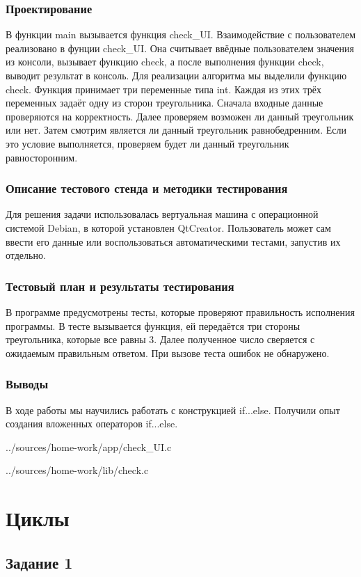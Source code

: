 \documentclass[12pt,a4paper]{report}
\begin{document}
\subsection{Проектирование}
В функции main вызывается функция check\_UI. Взаимодействие с пользователем реализовано в фунции check\_UI. Она считывает ввёдные пользователем значения из консоли, вызывает функцию check, а после выполнения функции check, выводит результат в консоль. Для реализации алгоритма мы выделили функцию check. Функция принимает три переменные типа int. Каждая из этих трёх переменных задаёт одну из сторон треугольника. Сначала входные данные проверяются на корректность. Далее проверяем возможен ли данный треугольник или нет. Затем смотрим является ли данный треугольник равнобедренним. Если это условие выполняется, проверяем будет ли данный треугольник равносторонним.
\subsection{Описание тестового стенда и методики тестирования}
Для решения задачи использовалась вертуальная машина с операционной системой Debian, в которой установлен QtCreator. 
Пользователь может сам ввести его данные или воспользоваться автоматическими тестами, запустив их отдельно.
\subsection{Тестовый план и результаты тестирования}
В программе предусмотрены тесты, которые проверяют правильность исполнения программы. В тесте вызывается функция, ей передаётся три стороны треугольника, которые все равны 3. Далее полученное число сверяется с ожидаемым правильным ответом. При вызове теста ошибок не обнаружено.
\subsection{Выводы}
В ходе работы мы научились работать с конструкцией if...else. Получили опыт создания вложенных операторов if...else.

{../sources/home-work/app/check_UI.c}


{../sources/home-work/lib/check.c}

\chapter{Циклы}
\section{Задание 1}
\end{document}
